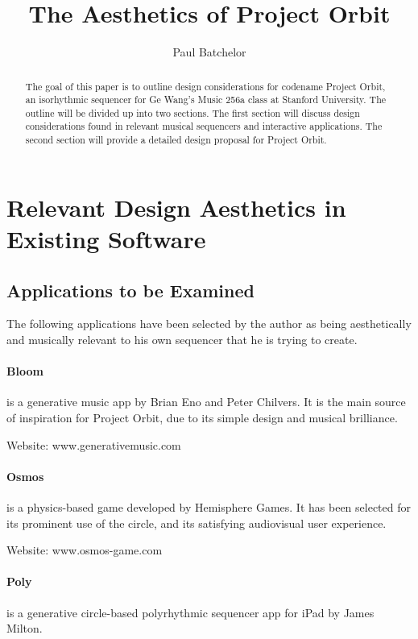 \documentclass[11pt, twocolumn]{article}
\author{Paul Batchelor}
\title{The Aesthetics of Project Orbit}
\begin{document}
\maketitle

\begin{abstract}

The goal of this paper is to outline design considerations for codename Project Orbit, an
isorhythmic sequencer for Ge Wang's Music 256a class at Stanford University. The outline
will be divided up into two sections. The first section will discuss design 
considerations found in relevant musical sequencers and interactive applications. The second
section will provide a detailed design proposal for Project Orbit.


\end{abstract}


\section{Relevant Design Aesthetics in Existing Software} 

\subsection{Applications to be Examined}
The following applications have been selected by the author as being aesthetically 
and musically relevant to his own sequencer that he is trying to create.


\paragraph{Bloom} is a generative music app by Brian Eno and Peter Chilvers. It is
the main source of inspiration for Project Orbit, due to its simple design and musical
brilliance.

Website: www.generativemusic.com

\paragraph{Osmos} is a physics-based game developed by Hemisphere Games. It has
been selected for its prominent use of the circle, and its satisfying audiovisual user experience.

Website: www.osmos-game.com


\paragraph{Poly} is a generative circle-based polyrhythmic sequencer app for 
iPad by James Milton. 
\end{document}
